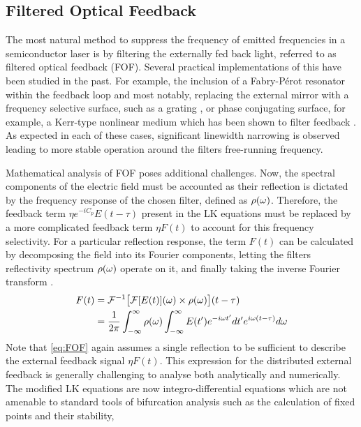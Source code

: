 \subsection*{Filtered Optical Feedback}
\label{subsec:FOF}
%
The most natural method to suppress the frequency of emitted frequencies in a semiconductor laser is by filtering the externally fed back light, referred to as filtered optical feedback (FOF). 
Several practical implementations of this have been studied in the past. 
For example, the inclusion of a Fabry-P\'erot resonator within the feedback loop \cite{detienne1997semiconductor} and most notably, replacing the external mirror with a frequency selective surface, 
such as a grating \cite{dahmani1987frequency, harvey1991external, jin1996single}, or phase conjugating surface, for example, a Kerr-type nonlinear medium which has been shown to filter feedback \cite{agrawal1984line}. 
As expected in each of these cases, significant linewidth narrowing is observed leading to more stable operation around the filters free-running frequency. 
%
\par
%
Mathematical analysis of FOF poses additional challenges. 
Now, the spectral components of the electric field must be accounted as their reflection is dictated by the frequency response of the chosen filter, defined as $\rho(\omega)$. 
Therefore, the feedback term $\eta e^{-i C_p} E(t-\tau)$ present in the LK equations must be replaced by a more complicated feedback term $\eta F(t)$ to account for this frequency selectivity. 
For a particular reflection response, the term $F(t)$ can be calculated by decomposing the field into its Fourier components, 
letting the filters reflectivity spectrum $\rho(\omega)$ operate on it, and finally taking the inverse Fourier transform \cite{yousefi1999dynamical}.
%
\begin{equation}
    \begin{aligned}
    \label{eq:FOF}
         F(t) &=  \mathcal{F}^{-1}\big[ \mathcal{F}[E(t)](\omega) \times \rho(\omega) \big](t-\tau)\\
              &= \frac{1}{2\pi} \int_{-\infty}^{\infty} \rho(\omega) \int_{-\infty}^{\infty} E(t') e^{-i \omega t'} dt' e^{i \omega (t-\tau)} d\omega
    \end{aligned}
\end{equation}
%
Note that \eqref{eq:FOF} again assumes a single reflection to be sufficient to describe the external feedback signal $\eta F(t)$. 
This expression for the distributed external feedback is generally challenging to analyse both analytically and numerically. 
The modified LK equations are now integro-differential equations which are not amenable to standard tools of bifurcation analysis such as the calculation of fixed points and their stability, 
